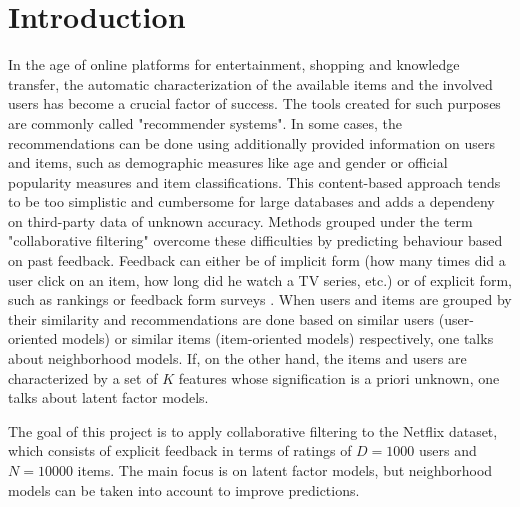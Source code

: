 \section{Introduction}

In the age of online platforms for entertainment, shopping and 
knowledge transfer, the automatic characterization of the available items and
the involved users has become a
crucial factor of success. 
The tools created for such purposes are commonly called "recommender
systems".
In some cases, the recommendations can be done using additionally provided
information on users and items, such as demographic measures like age and gender or official
popularity measures and item classifications. This content-based approach tends
to be too simplistic and cumbersome for large databases and adds a dependeny
on third-party data of unknown accuracy.  
Methods grouped under the term "collaborative filtering" overcome these
difficulties by predicting behaviour based on past feedback. Feedback can either be
of implicit form (how many times did a user click on an item, how long did he
watch a TV series, etc.) or of explicit form, such as rankings or feedback form
surveys \cite{Hu2008}.
When users and items are grouped by their similarity and recommendations are
done based on similar users (user-oriented models) or similar items
(item-oriented models) respectively, one talks about neighborhood models. 
If, on the other hand, the items and users are characterized by a set of $K$ features
whose signification is a priori unknown, one talks about latent factor models.


The goal of this project is to apply collaborative filtering to the Netflix
dataset, which consists of explicit feedback in terms of ratings of $D=1000$ users
and $N=10000$ items. The main focus is on latent factor models, but neighborhood
models can be taken into account to improve predictions.

